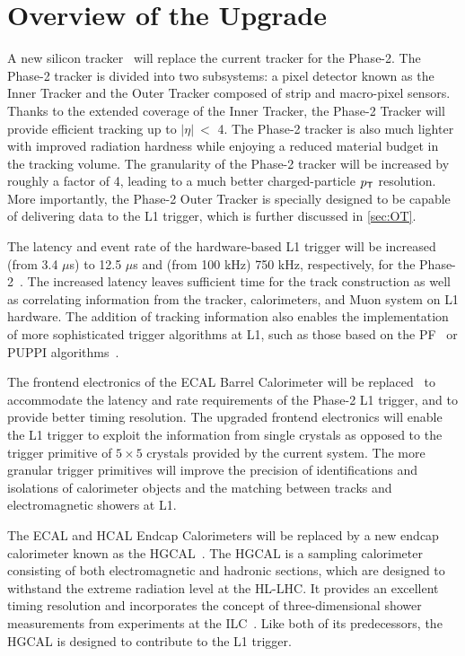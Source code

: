 \section{Overview of the Upgrade}
\label{sec:Overview}

A new silicon tracker~\cite{CMS:2017lum} will replace the current tracker for the Phase-2. The Phase-2 tracker is divided into two subsystems: a pixel detector known as the Inner Tracker and the Outer Tracker composed of strip and macro-pixel sensors. Thanks to the extended coverage of the Inner Tracker, the Phase-2 Tracker will provide efficient tracking up to $|\eta|~<$ 4. The Phase-2 tracker is also much lighter with improved radiation hardness while enjoying a reduced material budget in the tracking volume. The granularity of the Phase-2 tracker will be increased by roughly a factor of 4, leading to a much better charged-particle $p_{\textsf{T}}$ resolution. More importantly, the Phase-2 Outer Tracker is specially designed to be capable of delivering data to the \ac{L1} trigger, which is further discussed in \autoref{sec:OT}.

The latency and event rate of the hardware-based \ac{L1} trigger will be increased (from 3.4 $\mu$s) to 12.5 $\mu$s and (from 100 kHz) 750 kHz, respectively, for the Phase-2~\cite{Zabi:2020gjd}. The increased latency leaves sufficient time for the track construction as well as correlating information from the tracker, calorimeters, and Muon system on \ac{L1} hardware. The addition of tracking information also enables the implementation of more sophisticated trigger algorithms at \ac{L1}, such as those based on the \ac{PF}~\cite{CMS:2017yfk} or \ac{PUPPI} algorithms~\cite{Bertolini:2014bba}.

The frontend electronics of the \ac{ECAL} Barrel Calorimeter will be replaced~\cite{ECAL:upgrade} to accommodate the latency and rate requirements of the Phase-2 \ac{L1} trigger, and to provide better timing resolution. The upgraded frontend electronics will enable the \ac{L1} trigger to exploit the information from single crystals as opposed to the trigger primitive of $5\times5$ crystals provided by the current system. The more granular trigger primitives will improve the precision of identifications and isolations of calorimeter objects and the matching between tracks and electromagnetic showers at \ac{L1}. 

The \ac{ECAL} and \ac{HCAL} Endcap Calorimeters will be replaced by a new endcap calorimeter known as the \ac{HGCAL}~\cite{CMS:2017jpq}. The \ac{HGCAL} is a sampling calorimeter consisting of both electromagnetic
and hadronic sections, which are designed to withstand the extreme radiation level at the \ac{HL-LHC}. It provides an excellent timing resolution and incorporates the concept of three-dimensional shower measurements from experiments at the \ac{ILC}~\cite{CALICE:2008kht}. Like both of its predecessors, the \ac{HGCAL} is designed to contribute to the \ac{L1} trigger.

